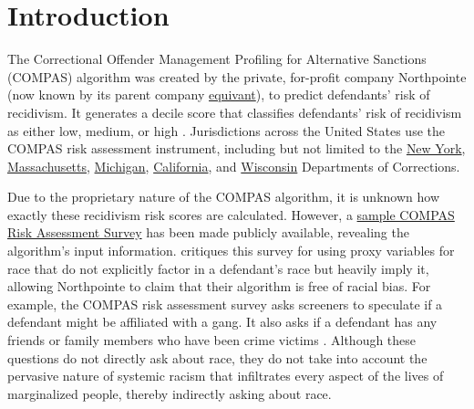 \documentclass[water,article,submit,moreauthors,pdftex]{mdpi}
\begin{document}

\hypertarget{introduction}{%
\section{Introduction}\label{introduction}}

The Correctional Offender Management Profiling for Alternative Sanctions
(COMPAS) algorithm was created by the private, for-profit company
Northpointe (now known by its parent company
\href{https://www.equivant.com/faq/}{equivant}), to predict defendants'
risk of recidivism. It generates a decile score that classifies
defendants' risk of recidivism as either low, medium, or high
\citep{angwin2016machine}. Jurisdictions across the United States use
the COMPAS risk assessment instrument, including but not limited to the
\href{https://doccs.ny.gov/system/files/documents/2020/11/8500.pdf}{New
York},
\href{https://hdsr.mitpress.mit.edu/pub/hzwo7ax4/release/4}{Massachusetts},
\href{https://hdsr.mitpress.mit.edu/pub/hzwo7ax4/release/4}{Michigan},
\href{https://hdsr.mitpress.mit.edu/pub/hzwo7ax4/release/4}{California},
and \href{https://doc.wi.gov/Pages/AboutDOC/COMPAS.aspx}{Wisconsin}
Departments of Corrections.

Due to the proprietary nature of the COMPAS algorithm, it is unknown how
exactly these recidivism risk scores are calculated. However, a
\href{https://www.documentcloud.org/documents/2702103-Sample-Risk-Assessment-COMPAS-CORE\#document/p5/a296598}{sample
COMPAS Risk Assessment Survey} has been made publicly available,
revealing the algorithm's input information. \citet{angwin2016machine}
critiques this survey for using proxy variables for race that do not
explicitly factor in a defendant's race but heavily imply it, allowing
Northpointe to claim that their algorithm is free of racial bias. For
example, the COMPAS risk assessment survey asks screeners to speculate
if a defendant might be affiliated with a gang. It also asks if a
defendant has any friends or family members who have been crime victims
\citep{Angwin2016Sample}. Although these questions do not directly ask
about race, they do not take into account the pervasive nature of
systemic racism that infiltrates every aspect of the lives of
marginalized people, thereby indirectly asking about race.
\end{document}
